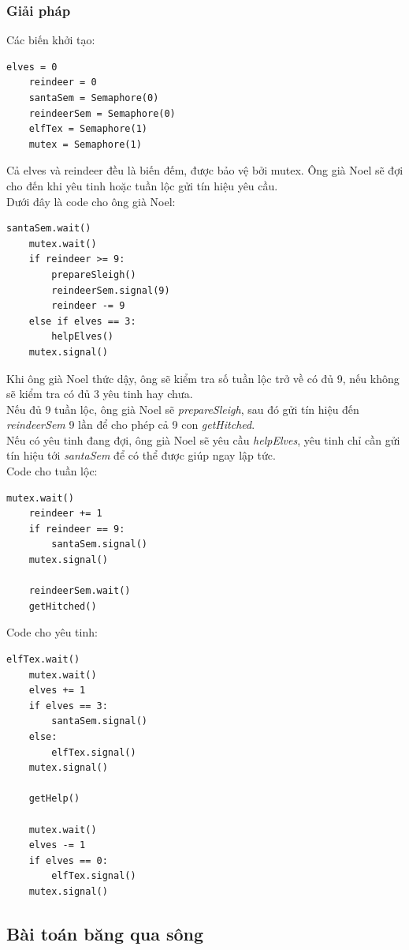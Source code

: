 \documentclass[12pt]{article}
\begin{document}
	\subsubsection{Giải pháp}
	Các biến khởi tạo:
	\begin{lstlisting}[style = Python]
	elves = 0 
	reindeer = 0 
	santaSem = Semaphore(0) 
	reindeerSem = Semaphore(0) 
	elfTex = Semaphore(1) 
	mutex = Semaphore(1)
	\end{lstlisting}
	Cả elves và reindeer đều là biến đếm, được bảo vệ bởi mutex. Ông già Noel sẽ đợi cho đến khi yêu tinh hoặc tuần lộc gửi tín hiệu yêu cầu. \\
	Dưới đây là code cho ông già Noel:
	\begin{lstlisting}[style = Python]
	santaSem.wait() 
	mutex.wait() 
	if reindeer >= 9: 
		prepareSleigh() 
		reindeerSem.signal(9) 
		reindeer -= 9 
	else if elves == 3: 
		helpElves() 
	mutex.signal()
	\end{lstlisting}
	Khi ông già Noel thức dậy, ông sẽ kiểm tra số tuần lộc trở về có đủ 9, nếu không sẽ kiểm tra có đủ 3 yêu tinh hay chưa.\\
	Nếu đủ 9 tuần lộc, ông già Noel sẽ \textit{prepareSleigh}, sau đó gửi tín hiệu đến \textit{reindeerSem} 9 lần để cho phép cả 9 con \textit{getHitched}.\\
	Nếu có yêu tinh đang đợi, ông già Noel sẽ yêu cầu \textit{helpElves}, yêu tinh chỉ cần gửi tín hiệu tới \textit{santaSem} để có thể được giúp ngay lập tức.\\
\newpage
Code cho tuần lộc:
	\begin{lstlisting}[style = Python]
	mutex.wait() 
	reindeer += 1 
	if reindeer == 9: 
		santaSem.signal() 
	mutex.signal()
	
	reindeerSem.wait()
	getHitched()
	\end{lstlisting}
Code cho yêu tinh:
	\begin{lstlisting}[style = Python]
	elfTex.wait() 
	mutex.wait() 
	elves += 1 
	if elves == 3: 
		santaSem.signal() 
	else:
		elfTex.signal()
	mutex.signal()

	getHelp()
	
	mutex.wait() 
	elves -= 1 
	if elves == 0: 
		elfTex.signal() 
	mutex.signal()
	\end{lstlisting}
\newpage
\subsection{Bài toán băng qua sông}
\end{document}
